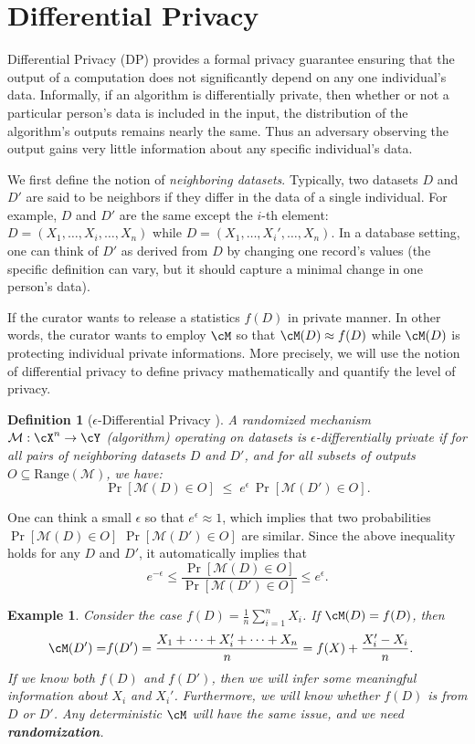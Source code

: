\documentclass[11pt, a4paper]{article}
\newtheorem{definition}{Definition}
\newtheorem{example}{Example}
\begin{document}
\section{Differential Privacy}

Differential Privacy (DP) provides a formal privacy guarantee ensuring that the output of a computation does not significantly depend on any one individual's data.
Informally, if an algorithm is differentially private, then whether or not a particular person's data is included in the input,
the distribution of the algorithm's outputs remains nearly the same.
Thus an adversary observing the output gains very little information about any specific individual's data.

We first define the notion of \emph{neighboring datasets}.
Typically, two datasets $D$ and $D'$ are said to be neighbors if they differ in the data of a single individual.
For example, $D$ and $D'$ are the same except the $i$-th element: $D = (X_1, \dots, X_i, \dots, X_n)$ while $D = (X_1, \dots, X_i', \dots, X_n)$.
In a database setting, one can think of $D'$ as derived from $D$ by changing one record's values 
(the specific definition can vary, but it should capture a minimal change in one person's data).

If the curator wants to release a statistics $f(D)$ in private manner.
In other words, the curator wants to employ $\cM$ so that $\cM(D) \approx f(D)$ while $\cM(D)$ is protecting individual private informations.
More precisely, we will use the notion of differential privacy to define privacy mathematically and quantify the level of privacy.
\begin{definition}[$\epsilon$-Differential Privacy \cite{Dwork2006}] \label{def:dp}
A randomized mechanism $\mathcal{M}: \cX^n \rightarrow \cY$ (algorithm) operating on datasets is $\epsilon$-differentially private if for all pairs of neighboring datasets $D$ and $D'$,
and for all subsets of outputs $O \subseteq \text{Range}(\mathcal{M})$, we have:
\[ 
\Pr[\mathcal{M}(D) \in O] \;\le\; e^{\epsilon} \,\Pr[\mathcal{M}(D') \in O].
\] 
\end{definition}
One can think a small $\epsilon$ so that $e^\epsilon \approx 1$,
which implies that two probabilities $\Pr[\mathcal{M}(D) \in O]$ $\Pr[\mathcal{M}(D') \in O]$ are similar.
Since the above inequality holds for any $D$ and $D'$, it automatically implies that
\[ 
e^{-\epsilon} \leq  \frac{\Pr[\mathcal{M}(D) \in O]}{\Pr[\mathcal{M}(D') \in O]} \leq e^{\epsilon}.
\] 

\begin{example}
    Consider the case $f(D) = \frac{1}{n} \sum_{i=1}^n X_i$.
    If $\cM(D) = f(D)$, then 
    \begin{align}
        \cM(D') =& f(D')= \frac{X_1+\dots+X_i'+\dots+X_n}{n} = f(X) + \frac{X_i'-X_i}{n}.
    \end{align}
    If we know both $f(D)$ and $f(D')$, then we will infer some meaningful information about $X_i$ and $X_i'$.
    Furthermore, we will know whether $f(D)$ is from $D$ or $D'$.
    Any deterministic $\cM$ will have the same issue, and we need {\bf randomization}.
\end{example}
\end{document}
